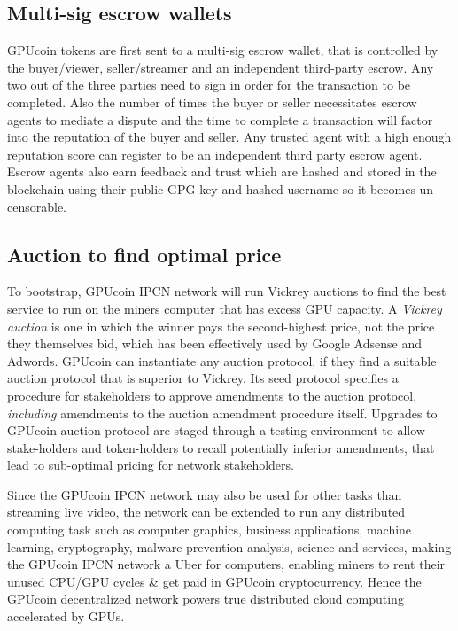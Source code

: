 \documentclass{article}
\begin{document}
\subsection{Multi-sig escrow wallets}
GPUcoin tokens are first sent to a multi-sig escrow wallet, that is controlled by the buyer/viewer, seller/streamer and an independent third-party escrow. Any two out of the three parties need to sign in order for the transaction to be completed. Also the number of times the buyer or seller necessitates escrow agents to mediate a dispute and the time to complete a transaction will factor into the reputation of the buyer and seller. Any trusted agent with a high enough reputation score can register to be an independent third party escrow agent. Escrow agents also earn feedback and trust which are hashed and stored in the blockchain using their public GPG key and hashed username so it becomes un-censorable.


\subsection{Auction to find optimal price}
To bootstrap, GPUcoin IPCN network will run Vickrey auctions to find the best service to run on the miners computer that has excess GPU capacity. A \emph{Vickrey auction} is one in which the winner pays the second-highest price, not the price they themselves bid, which has been effectively used by Google Adsense and Adwords.
GPUcoin can instantiate any auction protocol, if they find a suitable auction protocol that is superior to Vickrey. Its seed protocol specifies a procedure for stakeholders to approve amendments to the auction protocol,
\emph{including} amendments to the auction amendment procedure itself. Upgrades to GPUcoin auction protocol are staged through a testing environment to allow stake-holders and token-holders to recall potentially inferior amendments, that lead to sub-optimal pricing for network stakeholders. 

Since the GPUcoin IPCN network may also be used for other tasks than streaming live video, the network can be extended to run any distributed computing task such as computer graphics, business applications, machine learning, cryptography, malware prevention analysis, science and services, making the GPUcoin IPCN network a Uber for computers, enabling miners to rent their unused CPU/GPU cycles \& get paid in GPUcoin cryptocurrency. Hence the GPUcoin decentralized network powers true distributed cloud computing accelerated by GPUs.
\end{document}
